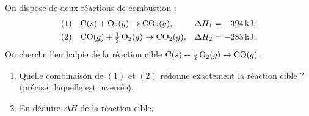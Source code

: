\documentclass[11pt,a4paper]{article}
\newcommand{\dH}{\Delta H}
\begin{document}
\begin{exercice}
On dispose de deux réactions de combustion :
\begin{align*}
(1)\quad & \ce{C}(s) + \ce{O2}(g) \rightarrow \ce{CO2}(g), & \dH_1 &= \SI{-394}{\kilo\joule} ; \\
(2)\quad & \ce{CO}(g) + \tfrac12\,\ce{O2}(g) \rightarrow \ce{CO2}(g), & \dH_2 &= \SI{-283}{\kilo\joule}.
\end{align*}
On cherche l'enthalpie de la réaction cible \;$\ce{C}(s) + \tfrac12\,\ce{O2}(g) \rightarrow \ce{CO}(g)$.
\begin{enumerate}[label=\alph*),leftmargin=2em,topsep=2pt,itemsep=2pt]
  \item Quelle combinaison de $(1)$ et $(2)$ redonne exactement la réaction cible ?
        (préciser laquelle est inversée).
  \item En déduire $\dH$ de la réaction cible.
\end{enumerate}
\end{exercice}
\end{document}
